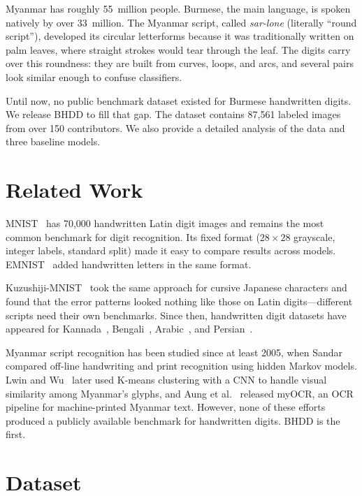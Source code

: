 \documentclass[conference]{IEEEtran}
\begin{document}
Myanmar has roughly 55~million people. Burmese, the main language, is
spoken natively by over 33~million. The Myanmar script, called
\textit{sar-lone} (literally ``round script''), developed its circular
letterforms because it was traditionally written on palm
leaves, where straight strokes would tear through the leaf. The digits carry
over this roundness: they are built from curves, loops, and arcs, and
several pairs look similar enough to confuse classifiers.

Until now, no public benchmark dataset existed for Burmese handwritten
digits. We release BHDD to fill that gap. The dataset contains 87,561
labeled images from over 150 contributors. We also provide a detailed
analysis of the data and three baseline models.

\section{Related Work}

MNIST~\cite{lecun1998gradient} has 70,000 handwritten Latin digit images
and remains the most common benchmark for digit recognition. Its fixed
format ($28\times28$ grayscale, integer labels, standard split) made it
easy to compare results across models.
EMNIST~\cite{cohen2017emnist} added handwritten letters in the same
format.

Kuzushiji-MNIST~\cite{clanuwat2018deep} took the same approach for
cursive Japanese characters and found that the error patterns looked
nothing like those on Latin digits---different scripts need their own
benchmarks. Since then, handwritten digit datasets have appeared for
Kannada~\cite{prabhu2019kannada}, Bengali~\cite{alam2018numtadb},
Arabic~\cite{elsawy2017arabic}, and
Persian~\cite{khosravi2007hoda}.

Myanmar script recognition has been studied since at least 2005, when
Sandar~\cite{sandar2005comparison} compared off-line handwriting and
print recognition using hidden Markov models.
Lwin and Wu~\cite{lwin2020myanmar} later used K-means clustering with a
CNN to handle visual similarity among Myanmar's glyphs, and
Aung et al.~\cite{aung2024myocr} released myOCR, an OCR pipeline
for machine-printed Myanmar text. However, none of these efforts
produced a publicly available benchmark for handwritten digits.
BHDD is the first.

\section{Dataset}
\end{document}
